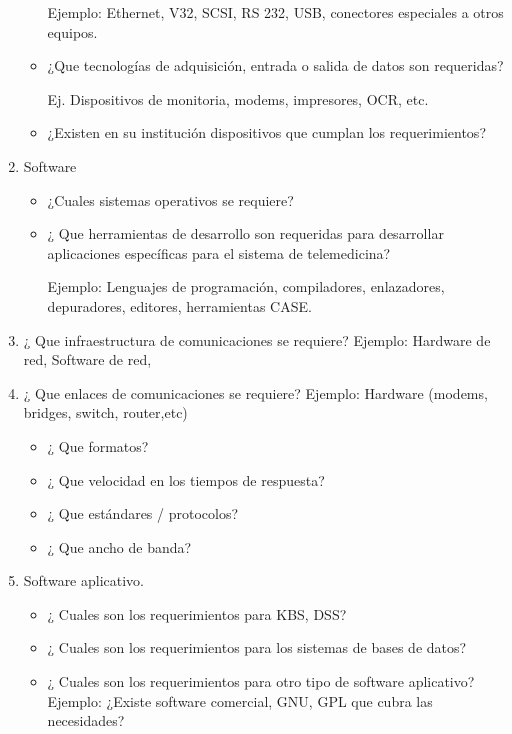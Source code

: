 \begin{enumerate}
\begin{itemize}
Ejemplo: Ethernet, V32, SCSI, RS 232, USB, conectores especiales a otros equipos.

\item ¿Que tecnologías de adquisición, entrada o salida de datos son requeridas? 

Ej. Dispositivos de monitoria, modems, impresores, OCR, etc.

\item ¿Existen en su institución dispositivos que cumplan los requerimientos?

\end{itemize}


\item  Software 

\begin{itemize}
\item ¿Cuales sistemas operativos se requiere? 
\item ¿ Que herramientas de desarrollo son requeridas para desarrollar aplicaciones específicas para el sistema de telemedicina? 

Ejemplo: Lenguajes de programación, compiladores, enlazadores, depuradores, editores, herramientas CASE.
\end{itemize}

\item  ¿ Que infraestructura de comunicaciones se requiere? 
Ejemplo: Hardware de red, Software de red, 

\item  ¿ Que enlaces de comunicaciones se requiere? 
Ejemplo: Hardware (modems, bridges, switch, router,etc) 

\begin{itemize}
\item ¿ Que formatos? 
\item ¿ Que velocidad en los tiempos de respuesta? 
\item ¿ Que estándares / protocolos?
\item ¿ Que ancho de banda?
\end{itemize}

\item  Software aplicativo. 

\begin{itemize}
\item ¿ Cuales son los requerimientos para KBS, DSS? 
\item ¿ Cuales son los requerimientos para los sistemas de bases de datos? 
\item ¿ Cuales son los requerimientos para otro tipo de software aplicativo?
Ejemplo: ¿Existe software comercial, GNU, GPL que cubra las necesidades? 
\end{itemize}


\end{enumerate}
